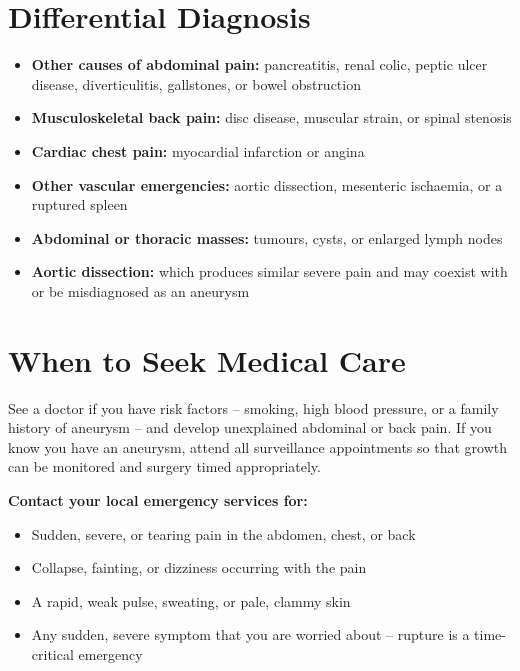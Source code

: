 \section*{Differential Diagnosis}
\begin{itemize}
    \item \textbf{Other causes of abdominal pain:} pancreatitis, renal colic, peptic ulcer disease, diverticulitis, gallstones, or bowel obstruction
    \item \textbf{Musculoskeletal back pain:} disc disease, muscular strain, or spinal stenosis
    \item \textbf{Cardiac chest pain:} myocardial infarction or angina
    \item \textbf{Other vascular emergencies:} aortic dissection, mesenteric ischaemia, or a ruptured spleen
    \item \textbf{Abdominal or thoracic masses:} tumours, cysts, or enlarged lymph nodes
    \item \textbf{Aortic dissection:} which produces similar severe pain and may coexist with or be misdiagnosed as an aneurysm
\end{itemize}

\section*{When to Seek Medical Care}
See a doctor if you have risk factors -- smoking, high blood pressure, or a family history of aneurysm -- and develop unexplained abdominal or back pain. If you know you have an aneurysm, attend all surveillance appointments so that growth can be monitored and surgery timed appropriately.

\textbf{Contact your local emergency services for:}
\begin{itemize}
    \item Sudden, severe, or tearing pain in the abdomen, chest, or back
    \item Collapse, fainting, or dizziness occurring with the pain
    \item A rapid, weak pulse, sweating, or pale, clammy skin
    \item Any sudden, severe symptom that you are worried about -- rupture is a time-critical emergency
\end{itemize}

